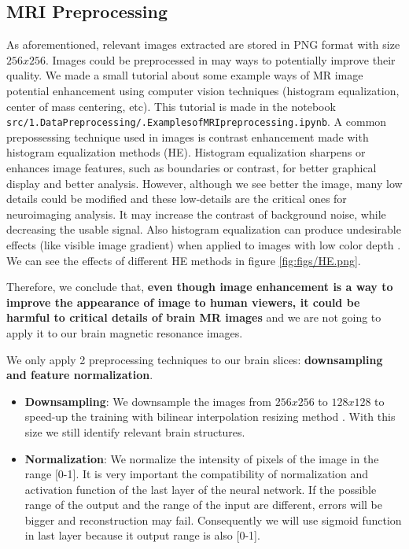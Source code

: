 \subsection{MRI Preprocessing}

As aforementioned, relevant images extracted are stored in PNG format with size $256x256$. Images could be preprocessed in may ways  to potentially improve their quality. We made a small tutorial about some example ways of MR image potential enhancement using computer vision techniques (histogram equalization, center of mass centering, etc). This tutorial is made in the notebook  \texttt{src\-/1.\-DataPrep\-roc\-\-essing/.\-Examples\-of\-MRI\-preprocessing\-.ipynb}. A common prepossessing technique used in images is contrast enhancement made with histogram equalization methods (HE). Histogram equalization sharpens or enhances image features, such as boundaries or contrast, for better graphical display and better analysis. However, although we see better the image, many low details could be modified and these low-details are the critical ones for neuroimaging analysis. It may increase the contrast of background noise, while decreasing the usable signal. Also histogram equalization can produce undesirable effects (like visible image gradient) when applied to images with low color depth \cite{histogrameq} \cite{histogrameq2}. We can see the effects of different HE methods in figure \ref{fig:figs/HE.png}.



Therefore, we conclude that, \textbf{even though image enhancement is a way to improve the appearance of image to human viewers, it could be harmful to critical details of brain MR images} and we are not going to apply it to our brain magnetic resonance images.

We only apply 2 preprocessing techniques to our brain slices: \textbf{downsampling and feature normalization}.
\begin{itemize}
    \item \textbf{Downsampling}: We downsample the images from $256x256$ to $128x128$ to speed-up the training with bilinear interpolation resizing method . With this size we still identify relevant brain structures. 
    \item \textbf{Normalization}: We normalize the intensity of pixels of the image in the range [0-1]. It is very important the compatibility of normalization and activation function of the last layer of the neural network. If the possible range of the output and the range of the input are different, errors will be bigger and reconstruction may fail. Consequently we will use sigmoid function in last layer because it output range is also [0-1].
\end{itemize}

